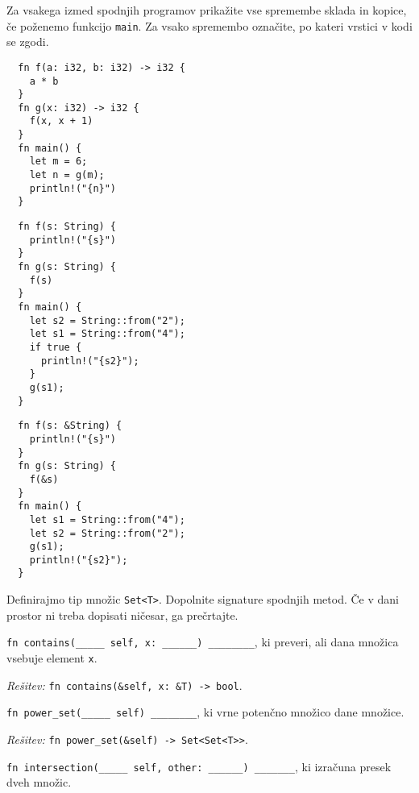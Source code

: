 \documentclass[arhiv]{../izpit}
\begin{document}


\naloga[\tocke{10}]

Za vsakega izmed spodnjih programov prikažite vse spremembe sklada in kopice, če poženemo funkcijo \texttt{main}. Za vsako spremembo označite, po kateri vrstici v kodi se zgodi.

\podnaloga
\begin{verbatim}
  fn f(a: i32, b: i32) -> i32 {
    a * b
  }
  fn g(x: i32) -> i32 {
    f(x, x + 1)
  }
  fn main() {
    let m = 6;
    let n = g(m);
    println!("{n}")
  }
\end{verbatim}

\podnaloga
\begin{verbatim}
  fn f(s: String) {
    println!("{s}")
  }
  fn g(s: String) {
    f(s)
  }
  fn main() {
    let s2 = String::from("2");
    let s1 = String::from("4");
    if true {
      println!("{s2}");
    }
    g(s1);
  }
\end{verbatim}

\podnaloga
\begin{verbatim}
  fn f(s: &String) {
    println!("{s}")
  }
  fn g(s: String) {
    f(&s)
  }
  fn main() {
    let s1 = String::from("4");
    let s2 = String::from("2");
    g(s1);
    println!("{s2}");
  }
\end{verbatim}



\naloga[\tocke{10}]

Definirajmo tip množic \texttt{Set<T>}. Dopolnite signature spodnjih metod. Če v dani prostor ni treba dopisati ničesar, ga prečrtajte.

\podnaloga
\texttt{fn contains(_____ self, x: ______) ________}, ki preveri, ali dana množica vsebuje element \texttt{x}.

\noindent
\emph{Rešitev:} \texttt{fn contains(&self, x: &T) -> bool}.

\podnaloga
\texttt{fn power_set(_____ self) ________}, ki vrne potenčno množico dane množice.

\noindent
\emph{Rešitev:} \texttt{fn power_set(&self) -> Set<Set<T>>}. 

\podnaloga
\texttt{fn intersection(_____ self, other: ______) _______}, ki izračuna presek dveh množic.
\end{document}
